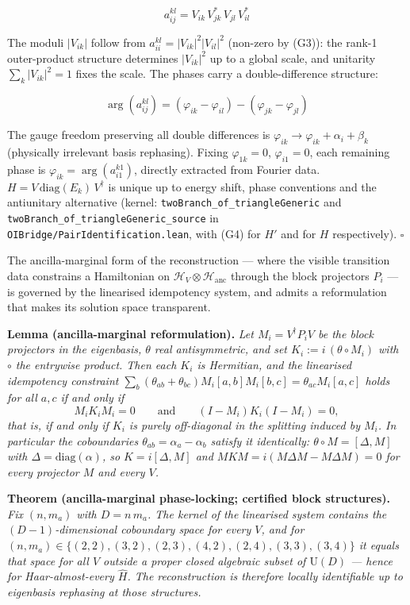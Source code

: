 \documentclass[
]{article}
\begin{document}
\[a_{ij}^{kl} = V_{ik}\, V_{jk}^*\, V_{jl}\, V_{il}^*\]

The moduli \(|V_{ik}|\) follow from
\(a_{ii}^{kl} = |V_{ik}|^2 |V_{il}|^2\) (non-zero by (G3)): the rank-1
outer-product structure determines \(|V_{ik}|^2\) up to a global scale,
and unitarity \(\sum_k |V_{ik}|^2 = 1\) fixes the scale. The phases
carry a double-difference structure:

\[\arg(a_{ij}^{kl}) = (\varphi_{ik} - \varphi_{il}) - (\varphi_{jk} - \varphi_{jl})\]

The gauge freedom preserving all double differences is
\(\varphi_{ik} \to \varphi_{ik} + \alpha_i + \beta_k\) (physically
irrelevant basis rephasing). Fixing \(\varphi_{1k} = 0\),
\(\varphi_{i1} = 0\), each remaining phase is
\(\varphi_{ik} = \arg(a_{i1}^{k1})\), directly extracted from Fourier
data. \(H = V \, \text{diag}(E_k) \, V^\dagger\) is unique up to energy
shift, phase conventions and the antiunitary alternative (kernel:
\texttt{twoBranch\_of\_triangleGeneric} and
\texttt{twoBranch\_of\_triangleGeneric\_source} in
\texttt{OIBridge/PairIdentification.lean}, with (G4) for \(H'\) and for
\(H\) respectively). \(\square\)

The ancilla-marginal form of the reconstruction --- where the visible
transition data constrains a Hamiltonian on
\(\mathcal{H}_V \otimes \mathcal{H}_{\text{anc}}\) through the block
projectors \(P_i\) --- is governed by the linearised idempotency system,
and admits a reformulation that makes its solution space transparent.

\textbf{Lemma (ancilla-marginal reformulation).} \emph{Let
\(M_i = V^\dagger P_i V\) be the block projectors in the eigenbasis,
\(\theta\) real antisymmetric, and set \(K_i := i\,(\theta \circ M_i)\)
with \(\circ\) the entrywise product. Then each \(K_i\) is Hermitian,
and the linearised idempotency constraint
\(\sum_b (\theta_{ab} + \theta_{bc}) M_i[a,b] M_i[b,c] = \theta_{ac} M_i[a,c]\)
holds for all \(a, c\) if and only if}
\[M_i K_i M_i = 0 \qquad \text{and} \qquad (I - M_i) K_i (I - M_i) = 0,\]
\emph{that is, if and only if \(K_i\) is purely off-diagonal in the
splitting induced by \(M_i\). In particular the coboundaries
\(\theta_{ab} = \alpha_a - \alpha_b\) satisfy it identically:
\(\theta \circ M = [\Delta, M]\) with
\(\Delta = \mathrm{diag}(\alpha)\), so \(K = i[\Delta, M]\) and
\(M K M = i(M \Delta M - M \Delta M) = 0\) for every projector \(M\) and
every \(V\).}

\textbf{Theorem (ancilla-marginal phase-locking; certified block
structures).} \emph{Fix \((n, m_a)\) with \(D = n \, m_a\). The kernel
of the linearised system contains the \((D-1)\)-dimensional coboundary
space for every \(V\), and for
\((n, m_a) \in \{(2,2), (3,2), (2,3), (4,2), (2,4), (3,3), (3,4)\}\) it
equals that space for all \(V\) outside a proper closed algebraic subset
of \(\mathrm{U}(D)\) --- hence for Haar-almost-every \(\hat{H}\). The
reconstruction is therefore locally identifiable up to eigenbasis
rephasing at those structures.}
\end{document}
